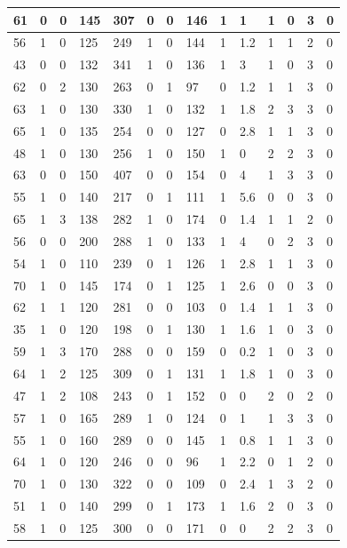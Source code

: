\documentclass{article}
\begin{document}
\begin{table}[h!]
\begin{tabular}{|l|l|l|l|l|l|l|l|l|l|l|l|l|l|}
61 & 0 & 0 & 145 & 307 & 0 & 0 & 146 & 1 & 1 & 1  &0 & 3 & 0 \\ \hline
56 & 1 & 0 & 125 & 249 & 1 & 0 & 144 & 1 & 1.2 & 1  &1 & 2 & 0 \\ \hline
43 & 0 & 0 & 132 & 341 & 1 & 0 & 136 & 1 & 3 & 1  &0 & 3 & 0 \\ \hline
62 & 0 & 2 & 130 & 263 & 0 & 1 & 97 & 0 & 1.2 & 1  &1 & 3 & 0 \\ \hline
63 & 1 & 0 & 130 & 330 & 1 & 0 & 132 & 1 & 1.8 & 2  &3 & 3 & 0 \\ \hline
65 & 1 & 0 & 135 & 254 & 0 & 0 & 127 & 0 & 2.8 & 1  &1 & 3 & 0 \\ \hline
48 & 1 & 0 & 130 & 256 & 1 & 0 & 150 & 1 & 0 & 2  &2 & 3 & 0 \\ \hline
63 & 0 & 0 & 150 & 407 & 0 & 0 & 154 & 0 & 4 & 1  &3 & 3 & 0 \\ \hline
55 & 1 & 0 & 140 & 217 & 0 & 1 & 111 & 1 & 5.6 & 0  &0 & 3 & 0 \\ \hline
65 & 1 & 3 & 138 & 282 & 1 & 0 & 174 & 0 & 1.4 & 1  &1 & 2 & 0 \\ \hline
56 & 0 & 0 & 200 & 288 & 1 & 0 & 133 & 1 & 4 & 0  &2 & 3 & 0 \\ \hline
54 & 1 & 0 & 110 & 239 & 0 & 1 & 126 & 1 & 2.8 & 1  &1 & 3 & 0 \\ \hline
70 & 1 & 0 & 145 & 174 & 0 & 1 & 125 & 1 & 2.6 & 0  &0 & 3 & 0 \\ \hline
62 & 1 & 1 & 120 & 281 & 0 & 0 & 103 & 0 & 1.4 & 1  &1 & 3 & 0 \\ \hline
35 & 1 & 0 & 120 & 198 & 0 & 1 & 130 & 1 & 1.6 & 1  &0 & 3 & 0 \\ \hline
59 & 1 & 3 & 170 & 288 & 0 & 0 & 159 & 0 & 0.2 & 1  &0 & 3 & 0 \\ \hline
64 & 1 & 2 & 125 & 309 & 0 & 1 & 131 & 1 & 1.8 & 1  &0 & 3 & 0 \\ \hline
47 & 1 & 2 & 108 & 243 & 0 & 1 & 152 & 0 & 0 & 2  &0 & 2 & 0 \\ \hline
57 & 1 & 0 & 165 & 289 & 1 & 0 & 124 & 0 & 1 & 1  &3 & 3 & 0 \\ \hline
55 & 1 & 0 & 160 & 289 & 0 & 0 & 145 & 1 & 0.8 & 1  &1 & 3 & 0 \\ \hline
64 & 1 & 0 & 120 & 246 & 0 & 0 & 96 & 1 & 2.2 & 0  &1 & 2 & 0 \\ \hline
70 & 1 & 0 & 130 & 322 & 0 & 0 & 109 & 0 & 2.4 & 1  &3 & 2 & 0 \\ \hline
51 & 1 & 0 & 140 & 299 & 0 & 1 & 173 & 1 & 1.6 & 2  &0 & 3 & 0 \\ \hline
58 & 1 & 0 & 125 & 300 & 0 & 0 & 171 & 0 & 0 & 2  &2 & 3 & 0 \\ \hline

\end{tabular}
\end{table}
\end{document}
